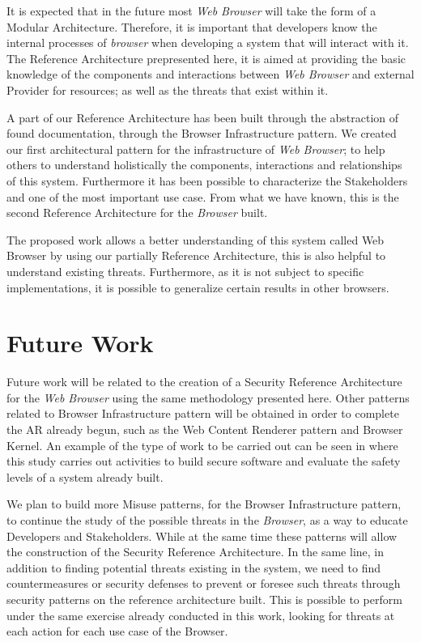 \documentclass{sig-alternate-05-2015}
\begin{document}
It is expected that in the future most \textit{Web Browser} will take the form of a Modular Architecture. Therefore, it is important that developers know the internal processes of \textit {browser} when developing a system that will interact with it. The Reference Architecture prepresented here, it is aimed at providing the basic knowledge of the components and interactions between \textit{Web Browser} and external Provider for resources; as well as the threats that exist within it.

A part of our Reference Architecture has been built through the abstraction of found documentation, through the Browser Infrastructure pattern. We created our first architectural pattern for the infrastructure of \textit{Web Browser}; to help others to understand holistically the components, interactions and relationships of this system. Furthermore it has been possible to characterize the Stakeholders and one of the most important use case. From what we have known, this is the second Reference Architecture for the \textit{Browser} built.

The proposed work allows a better understanding of this system called Web Browser by using our partially Reference Architecture, this is also helpful to understand existing threats. Furthermore, as it is not subject to specific implementations, it is possible to generalize certain results in other browsers.


\section*{Future Work}
Future work will be related to the creation of a Security Reference Architecture for the \textit{Web Browser} using the same methodology presented here. Other patterns related to Browser Infrastructure pattern will be obtained in order to complete the AR already begun, such as the Web Content Renderer pattern and Browser Kernel. An example of the type of work to be carried out can be seen in \cite{fernandez2014security} where this study carries out activities to build secure software and evaluate the safety levels of a system already built.

We plan to build more Misuse patterns, for the Browser Infrastructure pattern, to continue the study of the possible threats in the \textit{Browser}, as a way to educate Developers and Stakeholders. While at the same time these patterns will allow the construction of the Security Reference Architecture. In the same line, in addition to finding potential threats existing in the system, we need to find countermeasures or security defenses to prevent or foresee such threats through security patterns on the reference architecture built. This is possible to perform under the same exercise already conducted in this work, looking for threats at each action for each use case of the Browser.
\end{document}
